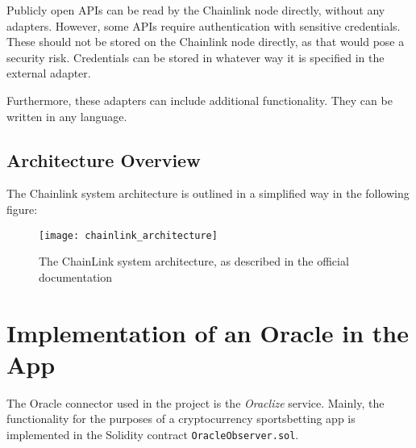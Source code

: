 Publicly open APIs can be read by the Chainlink node directly, without any adapters. However, some APIs require authentication with sensitive credentials. These should not be stored on the Chainlink node directly, as that would pose a security risk. Credentials can be stored in whatever way it is specified in the external adapter.

Furthermore, these adapters can include additional functionality. They can be written in any language\cite{chainlinkdoc}.
\subsection*{Architecture Overview}
The Chainlink system architecture is outlined in a simplified way in the following figure:
\begin{figure}[H]
\texttt{[image: chainlink\_architecture]}
\caption{The ChainLink system architecture, as described in the official documentation\cite{chainlinkdoc}}
\end{figure}

\section{Implementation of an Oracle in the App}
The Oracle connector used in the project is the \emph{Oraclize} service. Mainly, the functionality for the purposes of a cryptocurrency sportsbetting app is implemented in the Solidity contract \texttt{OracleObserver.sol}.
